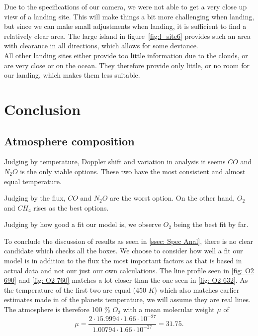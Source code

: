 \documentclass[reprint,english,notitlepage]{revtex4-2}
\begin{document}
    Due to the specifications of our camera, we were not able to get a very close up view of a landing site.
    This will make things a bit more challenging when landing, but since we can make small adjustments when landing, it is sufficient to find a relatively clear area.
    The large island in figure~\ref{fig:l_site6} provides such an area with clearance in all directions, which allows for some deviance.\\

    All other landing sites either provide too little information due to the clouds, or are very close or on the ocean.
    They therefore provide only little, or no room for our landing, which makes them less suitable.



\section{Conclusion} \label{sec: conclusion}
\subsection{Atmosphere composition} \label{ssec: Atmpos Comp}
Judging by temperature, Doppler shift and variation in analysis it seems $ CO $ and $ N_2O $ is the only viable options.
These two have the most consistent and almost equal temperature.

Judging by the flux, $ CO $ and $ N_2O  $ are the worst option.
On the other hand, $ O_2 $ and $ CH_4 $ rises as the best options.

Judging by how good a fit our model is, we observe $ O_2 $ being the best fit by far. 

To conclude the discussion of results as seen in \ref{ssec: Spec Anal}, there is no clear candidate which checks all the boxes.
We choose to consider how well a fit our model is in addition to the flux the most important factors as that is based in actual data and not our just our own calculations.
The line profile seen in \ref{fig: O2 690} and \ref{fig: O2 760} matches a lot closer than the one seen in \ref{fig: O2 632}.
As the temperature of the first two are equal (450 $ K $) which also matches earlier estimates made in %
of the planets temperature, we will assume they are real lines.
The atmosphere is therefore 100 \% $ O_2 $ with a mean molecular weight $ \mu $ of
\[
\mu =   \frac{2 ⋅ 15.9994 ⋅  1.66 ⋅ 10^{-27}}{1.00794 ⋅ 1.66  ⋅  10^{-27}} = 31.75.
\]
\end{document}
